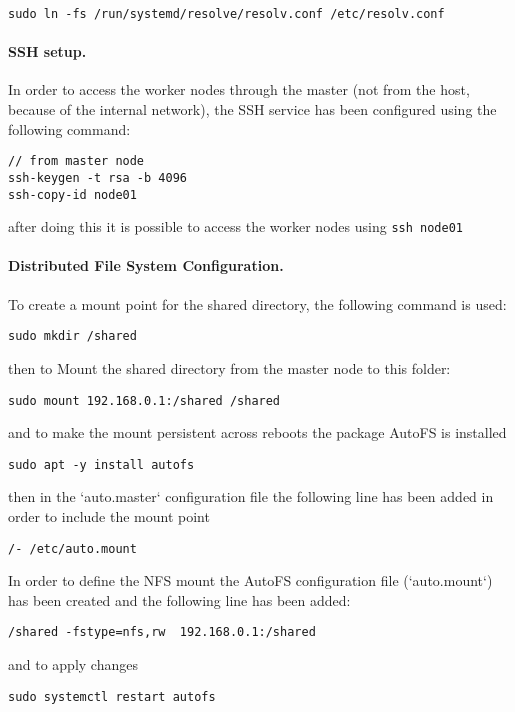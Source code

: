 \begin{verbatim}
sudo ln -fs /run/systemd/resolve/resolv.conf /etc/resolv.conf
\end{verbatim}

\paragraph{SSH setup.}
In order to access the worker nodes through the master (not from the host, because of the internal network), the SSH service has been configured using the following command:
\begin{verbatim}
// from master node
ssh-keygen -t rsa -b 4096
ssh-copy-id node01
\end{verbatim}

after doing this it is possible to access the worker nodes using \texttt{ssh node01}

\paragraph{Distributed File System Configuration.}
To create a mount point for the shared directory, the following command is used:

\begin{verbatim}
sudo mkdir /shared
\end{verbatim}
then to Mount the shared directory from the master node to this folder:

\begin{verbatim}
sudo mount 192.168.0.1:/shared /shared
\end{verbatim}
and to make the mount persistent across reboots the package AutoFS is installed

\begin{verbatim}
sudo apt -y install autofs
\end{verbatim}

then in the `auto.master` configuration file the following line has been added in order to include the mount point

\begin{verbatim}
/- /etc/auto.mount
\end{verbatim}
In order to define the NFS mount the AutoFS configuration file (`auto.mount`) has been created and the following line has been added:
\begin{verbatim}
/shared -fstype=nfs,rw  192.168.0.1:/shared
\end{verbatim}
and to apply changes
\begin{verbatim}
sudo systemctl restart autofs
\end{verbatim}


